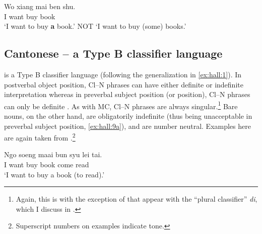 \documentclass[output=paper
,modfonts
,nonflat]{langsci/langscibook}
\begin{document}
\ea \label{ex:hall:6}
\gll 
Wo xiang mai ben shu.\\
I want buy {} book\\
\glt 
`I want to buy \textbf{a} book.' NOT `I want to buy (some) books.'\\
\z\vspace{-.5\baselineskip}\largerpage

\ea \label{ex:hall:7}
\z
\z

\subsection{Cantonese -- a Type B classifier language}

 is a Type B classifier language (following the generalization in \ref{ex:hall:1}). In postverbal object position, Cl--N phrases can have either definite or indefinite interpretation  whereas in preverbal subject position (or  position), Cl--N phrases can only be definite . As with MC, Cl--N phrases are always singular.\footnote{Again, this is with the exception of  that appear with the ``plural classifier'' \textit{di}, which I discuss in \citet[\S4.2.3]{Hall2015}.} Bare nouns, on the other hand, are obligatorily indefinite (thus being unacceptable in preverbal subject position, \ref{ex:hall:9a}), and are number neutral. Examples here are again taken from \citet{ChengSybesma1999}.\footnote{Superscript numbers on  examples indicate tone.}

\ea \label{ex:hall:8}
\gll
Ngo soeng maai bun syu {\op}lei tai. \\
I want buy {} book \phantom{(}come read\\
\glt 
`I want to buy a book (to read).'\\
\z\vspace{-.5\baselineskip}
\end{document}
